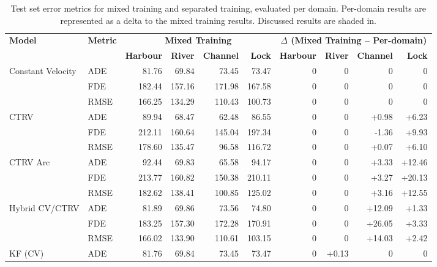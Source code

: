 \begin{table}[htbp]
\centering
\caption[Exp. II Error Metrics]{Test set error metrics for mixed training and separated training, evaluated per domain. Per-domain results are represented as a delta to the mixed training results. Discussed results are shaded in.} 
\label{tab:results_exp1_exp2_merged_deltas}
\vspace{-0.3em}
\fontsize{9pt}{9.5pt}\selectfont
\renewcommand{\arraystretch}{0.85} %
\setlength{\tabcolsep}{3pt} 
\begin{tabular}{llrrrrrrrr}
\toprule
\textbf{Model} & \textbf{Metric} & 
\multicolumn{4}{c}{\textbf{Mixed Training}} & 
\multicolumn{4}{c}{\textbf{$\Delta$ (Mixed Training -- Per-domain)}} \\
\cmidrule(lr){3-6} \cmidrule(l){7-10} %
& & 
\textbf{Harbour} & \textbf{River} & \textbf{Channel} & \textbf{Lock} &
\textbf{Harbour} & \textbf{River} & \textbf{Channel} & \textbf{Lock} \\
\midrule
Constant Velocity   
& ADE  & 81.76 & 69.84 & 73.45 & 73.47 & 0 & 0 & 0 & 0 \\
& FDE  & 182.44 & 157.16 & 171.98 & 167.58 & 0 & 0 & 0 & 0 \\
& RMSE & 166.25 & 134.29 & 110.43 & 100.73 & 0 & 0 & 0 & 0 \\
\midrule
CTRV                
& ADE  & 89.94 & 68.47 & 62.48 & 86.55 & 0 & 0 & +0.98 & +6.23 \\
& FDE  & 212.11 & 160.64 & 145.04 & 197.34 & 0 & 0 & -1.36 & +9.93 \\
& RMSE & 178.60 & 135.47 & 96.58 & 116.72 & 0 & 0 & +0.07 & +6.10 \\
\midrule
CTRV Arc            
& ADE  & 92.44 & 69.83 & 65.58 & 94.17 & 0 & 0 & +3.33 & +12.46 \\
& FDE  & 213.77 & 160.82 & 150.38 & 210.11 & 0 & 0 & +3.27 & +20.13 \\
& RMSE & 182.62 & 138.41 & 100.85 & 125.02 & 0 & 0 & +3.16 & +12.55 \\
\midrule
Hybrid CV/CTRV      
& ADE  & 81.89 & 69.86 & 73.56 & 74.80 & 0 & 0 & +12.09 & +1.33 \\
& FDE  & 183.25 & 157.30 & 172.28 & 170.91 & 0 & 0 & +26.05 & +3.33 \\
& RMSE & 166.02 & 133.90 & 110.61 & 103.15 & 0 & 0 & +14.03 & +2.42 \\
\midrule
KF (CV)             
& ADE  & 81.76 & 69.84 & 73.45 & 73.47 & 0 & +0.13 & 0 & 0 \\

\end{tabular}
\end{table}
